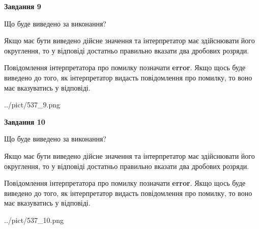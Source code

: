 \documentclass[12pt, ukrainian]{article}
\begin{document}
{\begin {Large}
{\begin {center}\textbf{Завдання 9}\end {center}}\par
Що буде виведено за виконання? \par

Якщо має бути виведено дійсне значення та інтерпретатор має здійснювати його округлення, 
то у відповіді достатньо правильно вказати два дробових розряди.

Повідомлення інтерпретатора про помилку позначати \textbf{error}.
Якщо щось буде виведено до того, як інтерпретатор видасть повідомлення про помилку, 
то воно має вказуватись у відповіді. \par

\begin{center}
	{../pict/537_9.png}
\end{center}
\newpage

{\begin {center}\textbf{Завдання 10}\end {center}}\par
Що буде виведено за виконання? \par

Якщо має бути виведено дійсне значення та інтерпретатор має здійснювати його округлення, 
то у відповіді достатньо правильно вказати два дробових розряди.

Повідомлення інтерпретатора про помилку позначати \textbf{error}.
Якщо щось буде виведено до того, як інтерпретатор видасть повідомлення про помилку, 
то воно має вказуватись у відповіді. \par

\begin{center}
	{../pict/537_10.png}
\end{center}
\newpage

\end {Large}}
\end{document}
